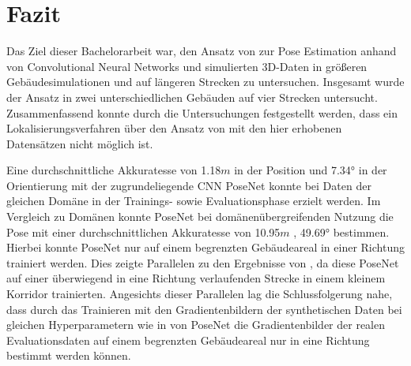 
\section{Fazit}
\label{sec:kapitel_6}
Das Ziel dieser Bachelorarbeit war, den Ansatz von \citet{acharyaBIMPoseNetIndoorCamera2019} zur Pose Estimation anhand von Convolutional Neural Networks und simulierten 3D-Daten in größeren Gebäudesimulationen und auf längeren Strecken zu untersuchen.
Insgesamt wurde der Ansatz in zwei unterschiedlichen Gebäuden auf vier Strecken untersucht. Zusammenfassend konnte durch die Untersuchungen festgestellt werden, dass ein Lokalisierungsverfahren über den Ansatz von \citet{acharyaBIMPoseNetIndoorCamera2019} mit den hier erhobenen Datensätzen nicht möglich ist.


Eine durchschnittliche Akkuratesse von 1.18$m$ in der Position und 7.34° in der Orientierung mit der zugrundeliegende CNN PoseNet konnte bei Daten der gleichen Domäne in der Trainings- sowie Evaluationsphase erzielt werden. Im Vergleich zu Domänen konnte PoseNet bei domänenübergreifenden Nutzung die Pose mit einer durchschnittlichen Akkuratesse von 10.95$m$ , 49.69° bestimmen. Hierbei konnte PoseNet nur auf einem begrenzten Gebäudeareal in einer Richtung trainiert werden. Dies zeigte Parallelen zu den Ergebnisse von \citet{acharyaBIMPoseNetIndoorCamera2019}, da diese PoseNet auf einer überwiegend in eine Richtung verlaufenden Strecke in einem kleinem Korridor trainierten. Angesichts dieser Parallelen lag die Schlussfolgerung nahe, dass durch das Trainieren mit den Gradientenbildern der synthetischen Daten bei gleichen Hyperparametern wie in \cite{acharyaBIMPoseNetIndoorCamera2019} von PoseNet die Gradientenbilder der realen Evaluationsdaten auf einem begrenzten Gebäudeareal nur in eine Richtung bestimmt werden können.


